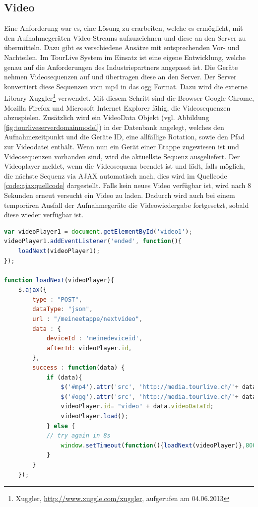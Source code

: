 \subsection{Video}
Eine Anforderung war es, eine Lösung zu erarbeiten, welche es ermöglicht, mit den Aufnahmegeräten Video-Streams aufzuzeichnen und diese an den Server zu übermitteln. Dazu gibt es verschiedene Ansätze mit entsprechenden Vor- und Nachteilen. Im TourLive System im Einsatz ist eine eigene Entwicklung, welche genau auf die Anforderungen des Industriepartners angepasst ist. Die Geräte nehmen Videosequenzen auf und übertragen diese an den Server. Der Server konvertiert diese Sequenzen vom mp4 in das ogg Format. Dazu wird die externe Library Xuggler\footnote{Xuggler, \url{http://www.xuggle.com/xuggler}, aufgerufen am 04.06.2013} verwendet. Mit diesem Schritt sind die Browser Google Chrome, Mozilla Firefox und Microsoft Internet Explorer fähig, die Videosequenzen abzuspielen. Zusätzlich wird ein VideoData Objekt (vgl. Abbildung \ref{fig:tourliveserverdomainmodel}) in der Datenbank angelegt, welches den Aufnahmezeitpunkt und die Geräte ID, eine allfällige Rotation, sowie den Pfad zur Videodatei enthält. Wenn nun ein Gerät einer Etappe zugewiesen ist und Videosequenzen vorhanden sind, wird die aktuellste Sequenz ausgeliefert. Der Videoplayer meldet, wenn die Videosequenz beendet ist und lädt, falls möglich, die nächste Sequenz via AJAX automatisch nach, dies wird im Quellcode \ref{code:ajaxquellcode} dargestellt. Falls kein neues Video verfügbar ist, wird nach 8 Sekunden erneut versucht ein Video zu laden. Dadurch wird auch bei einem temporären Ausfall der Aufnahmegeräte die Videowiedergabe fortgesetzt, sobald diese wieder verfügbar ist.

\begin{lstlisting}[language=JavaScript, caption=Automatisches Nachladen von Videosequenzen, label=code:ajaxquellcode]
var videoPlayer1 = document.getElementById('video1');
videoPlayer1.addEventListener('ended', function(){
	loadNext(videoPlayer1);
});

function loadNext(videoPlayer){
	$.ajax({
		type : "POST",
		dataType: "json",
		url : "/meineetappe/nextvideo",
		data : {
			deviceId : 'meinedeviceid',
			afterId: videoPlayer.id,
		},
		success : function(data) {
			if (data){
				$('#mp4').attr('src', 'http://media.tourlive.ch/'+ data.videoLocation + '.mp4');
				$('#ogg').attr('src', 'http://media.tourlive.ch/'+ data.videoLocation + '.ogg');
				videoPlayer.id= "video" + data.videoDataId;
				videoPlayer.load();
			} else {
			// try again in 8s
				window.setTimeout(function(){loadNext(videoPlayer)},8000);
			}
		}
	});
\end{lstlisting}

